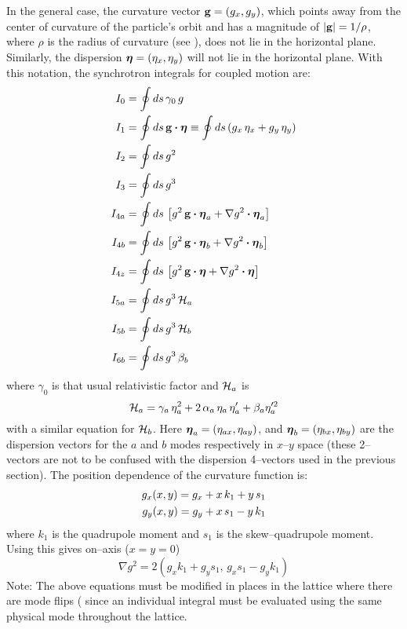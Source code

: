 In the general case, the curvature vector ${\bf g} = (g_x, g_y)$, which points away from the center of
curvature of the particle's orbit and has a magnitude of $|{\bf g}| = 1/\rho$, where $\rho$ is the
radius of curvature (see ), does not lie in the horizontal plane. Similarly, the
dispersion $\boldsymbol{\eta} = (\eta_x, \eta_y)$ will not lie in the horizontal plane. With this notation,
the synchrotron integrals for coupled motion are:
  \begingroup
  \allowdisplaybreaks
  \begin{align}
    I_0 &= \oint ds \, \gamma_0 \, g \\
    I_1 &= \oint ds \, {\bf g} \mathbin{\boldsymbol{\cdot}} \boldsymbol{\eta} 
         \equiv \oint ds \, (g_x \, \eta_x + g_y \, \eta_y) \\
    I_2 &= \oint ds \, g^2 \\
    I_3 &= \oint ds \, g^3 \\
    I_{4a} &= \oint ds \, \left[ g^2 \, {\bf g} \mathbin{\boldsymbol{\cdot}} \boldsymbol{\eta}_a + 
         \nabla g^2 \mathbin{\boldsymbol{\cdot}} \boldsymbol{\eta}_a \right] \\
    I_{4b} &= \oint ds \, \left[ g^2 \, {\bf g} \mathbin{\boldsymbol{\cdot}} \boldsymbol{\eta}_b + 
         \nabla g^2 \mathbin{\boldsymbol{\cdot}} \boldsymbol{\eta}_b \right] \\
    I_{4z} &= \oint ds \, \left[ g^2 \, {\bf g} \mathbin{\boldsymbol{\cdot}} \boldsymbol{\eta} + 
         \nabla g^2 \mathbin{\boldsymbol{\cdot}} \boldsymbol{\eta} \right] \\
    I_{5a} &= \oint ds \, g^3 \, {\cal H}_a \\
    I_{5b} &= \oint ds \, g^3 \, {\cal H}_b \\
    I_{6b} &= \oint ds \, g^3 \, \beta_b
  \end{align}
  \endgroup
where $\gamma_0$ is that usual relativistic factor and ${\cal H}_a$ is 
  \begin{equation}
    {\cal H}_a = \gamma_a \, \eta_a^2 + 2 \, \alpha_a \, \eta_a \, \eta_a' + 
      \beta_a \eta_a'^2 
  \end{equation}
with a similar equation for ${\cal H}_b$. Here $\boldsymbol{\eta}_a =
(\eta_{ax}, \eta_{ay})$, and $\boldsymbol{\eta}_b = (\eta_{bx}, \eta_{by})$
are the dispersion vectors for the $a$ and $b$ modes respectively in
$x$--$y$ space (these 2--vectors are not to be confused with the
dispersion 4--vectors used in the previous section). The position
dependence of the curvature function is:
  \begin{align}
    g_x(x,y) = g_{x} + x \, k_1 + y \, s_1 \nonumber \\
    g_y(x,y) = g_{y} + x \, s_1 - y \, k_1 
  \end{align}
where $k_1$ is the quadrupole moment and $s_1$ is the skew--quadrupole moment.
Using this gives on--axis ($x = y = 0$)
  \begin{equation}
    \nabla g^2 = 2 \left( g_x k_1 + g_y s_1, \, g_x s_1 - g_y k_1 \right)
    \label{g2gkg}
  \end{equation}
Note: The above equations must be modified in places in the lattice where there are mode flips
( since an individual integral must be evaluated using the same physical mode
throughout the lattice.

